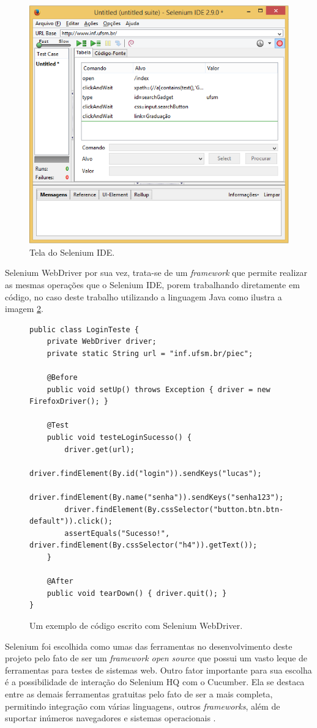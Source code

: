 \documentclass[tg]{mdtufsm}
\begin{document}
\begin{figure}[!htb]
	\centering
	\includegraphics[width=0.7
	\textwidth]{selenium_ide}
	\caption{Tela do Selenium IDE.}
	\label{fig:seleniumIDE}
\end{figure}

Selenium WebDriver por sua vez, trata-se de um \emph{framework} que permite realizar as mesmas operações que o Selenium IDE, porem trabalhando diretamente em código, no caso deste trabalho utilizando a linguagem Java como ilustra a imagem \ref{code:seleniumWebDriver}.

\begin{figure}[!htt]
	\begin{lstlisting}
public class LoginTeste {
	private WebDriver driver;
	private static String url = "inf.ufsm.br/piec";
	
	@Before
	public void setUp() throws Exception { driver = new FirefoxDriver(); }
	
	@Test
	public void testeLoginSucesso() {
		driver.get(url);
		driver.findElement(By.id("login")).sendKeys("lucas");
		driver.findElement(By.name("senha")).sendKeys("senha123");
		driver.findElement(By.cssSelector("button.btn.btn-default")).click();
		assertEquals("Sucesso!", driver.findElement(By.cssSelector("h4")).getText());
	}
	
	@After
	public void tearDown() { driver.quit(); }
}
	\end{lstlisting}
	\caption{Um exemplo de código escrito com Selenium WebDriver.}
	\label{code:seleniumWebDriver}
\end{figure}

Selenium foi escolhida como umas das ferramentas no desenvolvimento deste projeto pelo fato de ser um \emph{framework open source} que possui um vasto leque de ferramentas para testes de sistemas web. Outro fator
importante para sua escolha é a possibilidade de interação do Selenium HQ com o Cucumber. Ela se destaca entre as demais ferramentas gratuitas pelo fato de ser a mais completa, permitindo integração com
várias linguagens, outros \emph{frameworks}, além de suportar inúmeros navegadores e sistemas operacionais \cite{pereiraestudoselenium}.
\end{document}
